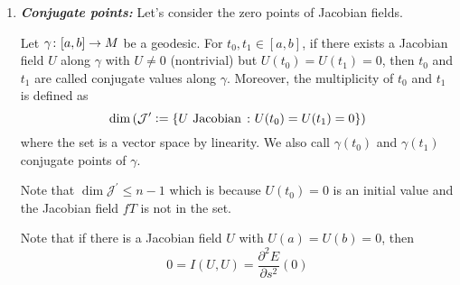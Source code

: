 \begin{enumerate}[label=\arabic{*}.]
\begin{proof}
\begin{equation*}
\begin{aligned}
				&= \lv{\widetilde{\nabla}_{\frac{\partial}{\partial s}} \bc{\lv{\frac{\partial F}{\partial t}}_{t=0}}}_{s=0} \\
				&= \lv{\widetilde{\nabla}_{\frac{\partial}{\partial s}} V(s) + sW(s)}_{s=0} \\
				&= W(0) = \nabla_TU(0)
			\end{aligned}
		\end{equation*}
		So the claim has be proved.
	\end{proof}
	\begin{rmk}
		In particular, if $\beta(s) \equiv \gamma(0)$, then
		\begin{equation*}
			F(t,s) = \exp_{\gamma(0)}t(V+sW),\quad V = \dot{\gamma}(0),~W = \nabla_TU(0)
		\end{equation*}
		and $U(t) = \frac{\partial F}{\partial s}(t,0)$.
	\end{rmk}

	\item \emph{\textbf{Conjugate points:}} Let's consider the zero points of Jacobian fields.
	\begin{defn}
		Let $\gamma \colon [a,b] \rightarrow M$ be a geodesic. For $t_0,t_1 \in [a,b]$, if there exists a Jacobian field $U$ along $\gamma$ with $U \neq 0$ (nontrivial) but $U(t_0) = U(t_1) = 0$, then $t_0$ and $t_1$ are called conjugate values along $\gamma$. Moreover, the multiplicity of $t_0$ and $t_1$ is defined as
		\begin{equation*}
			\dim \left(\mathcal{J}^\prime \vcentcolon= \left\{U \text{ Jacobian } \colon U(t_0) = U(t_1) = 0\right\}\right)
		\end{equation*}
		where the set is a vector space by linearity. We also call $\gamma(t_0)$ and $\gamma(t_1)$ conjugate points of $\gamma$.
	\end{defn}
	\begin{rmk}
		Note that $\dim \mathcal{J}^\prime \leq n-1$ which is because $U(t_0) = 0$ is an initial value and the Jacobian field $fT$ is not in the set.
	\end{rmk}
	\begin{rmk}
		Note that if there is  a Jacobian field $U$ with $U(a) = U(b) = 0$, then
		\begin{equation*}
			0 = I(U,U) = \frac{\partial^2 E}{\partial s^2}(0)
		\end{equation*}
	\end{rmk}


\end{enumerate}
